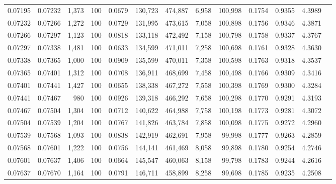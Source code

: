 \begin{tabular}{rrrrrrrrrrrrr}
0.07195 & 0.07232 & 1,373 & 100 &                                     0.0679 & 130,723 & 474,887 &   6,958 & 100,998 & 0.1754 & 0.9355 & 4.3989 \\
0.07232 & 0.07266 & 1,272 & 100 &                                     0.0729 & 131,995 & 473,615 &   7,058 & 100,898 & 0.1756 & 0.9346 & 4.3871 \\
0.07266 & 0.07297 & 1,123 & 100 &                                     0.0818 & 133,118 & 472,492 &   7,158 & 100,798 & 0.1758 & 0.9337 & 4.3767 \\
0.07297 & 0.07338 & 1,481 & 100 &                                     0.0633 & 134,599 & 471,011 &   7,258 & 100,698 & 0.1761 & 0.9328 & 4.3630 \\
0.07338 & 0.07365 & 1,000 & 100 &                                     0.0909 & 135,599 & 470,011 &   7,358 & 100,598 & 0.1763 & 0.9318 & 4.3537 \\
0.07365 & 0.07401 & 1,312 & 100 &                                     0.0708 & 136,911 & 468,699 &   7,458 & 100,498 & 0.1766 & 0.9309 & 4.3416 \\
0.07401 & 0.07441 & 1,427 & 100 &                                     0.0655 & 138,338 & 467,272 &   7,558 & 100,398 & 0.1769 & 0.9300 & 4.3284 \\
0.07441 & 0.07467 &   980 & 100 &                                     0.0926 & 139,318 & 466,292 &   7,658 & 100,298 & 0.1770 & 0.9291 & 4.3193 \\
0.07467 & 0.07504 & 1,304 & 100 &                                     0.0712 & 140,622 & 464,988 &   7,758 & 100,198 & 0.1773 & 0.9281 & 4.3072 \\
0.07504 & 0.07539 & 1,204 & 100 &                                     0.0767 & 141,826 & 463,784 &   7,858 & 100,098 & 0.1775 & 0.9272 & 4.2960 \\
0.07539 & 0.07568 & 1,093 & 100 &                                     0.0838 & 142,919 & 462,691 &   7,958 &  99,998 & 0.1777 & 0.9263 & 4.2859 \\
0.07568 & 0.07601 & 1,222 & 100 &                                     0.0756 & 144,141 & 461,469 &   8,058 &  99,898 & 0.1780 & 0.9254 & 4.2746 \\
0.07601 & 0.07637 & 1,406 & 100 &                                     0.0664 & 145,547 & 460,063 &   8,158 &  99,798 & 0.1783 & 0.9244 & 4.2616 \\
0.07637 & 0.07670 & 1,164 & 100 &                                     0.0791 & 146,711 & 458,899 &   8,258 &  99,698 & 0.1785 & 0.9235 & 4.2508 \\

\end{tabular}
